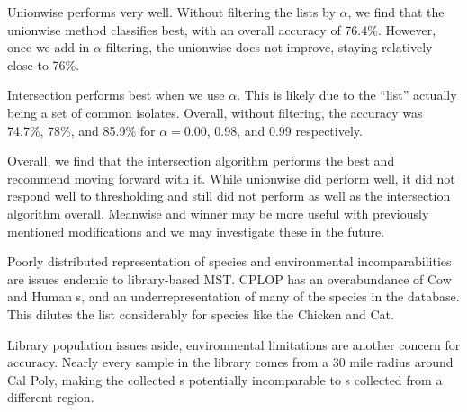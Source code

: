 Unionwise performs very well. Without filtering the \knnlong{} lists by $\alpha$, we find that the unionwise method classifies best, with an overall accuracy of 76.4\%. However, once we add in $\alpha$ filtering, the unionwise does not improve, staying relatively close to 76\%. 

Intersection performs best when we use $\alpha$. This is likely due to the ``list'' actually being a set of common isolates. Overall, without filtering, the accuracy was 74.7\%, 78\%, and 85.9\% for $\alpha = $0.00, 0.98, and 0.99 respectively. 

Overall, we find that the intersection algorithm performs the best and recommend moving forward with it. While unionwise did perform well, it did not respond well to thresholding and still did not perform as well as the intersection algorithm overall. Meanwise and winner may be more useful with previously mentioned modifications and we may investigate these in the future.


Poorly distributed representation of species and environmental incomparabilities are issues endemic to library-based MST. CPLOP has an overabundance of Cow and Human \isol{}s, and an underrepresentation of many of the species in the database. This dilutes the \knnlong{} list considerably for species like the Chicken and Cat. 

Library population issues aside, environmental limitations are another concern for accuracy. Nearly every sample in the library comes from a 30 mile radius around Cal Poly, making the collected \pyro{}s potentially incomparable to \pyro{}s collected from a different region.

